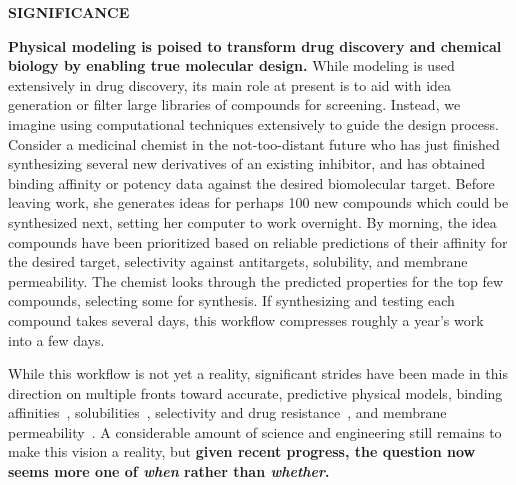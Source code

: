 \documentclass[11pt]{article}
\begin{document}




{\large \bf SIGNIFICANCE}

\textbf{Physical modeling is poised to transform drug discovery and chemical biology by enabling true molecular design.}
While modeling is used extensively in drug discovery, its main role at present is to aid with idea generation or filter large libraries of compounds for screening. 
Instead, we imagine using computational techniques extensively to guide the design process. 
Consider a medicinal chemist in the not-too-distant future who has just finished synthesizing several new derivatives of an existing inhibitor, and has obtained binding affinity or potency data against the desired biomolecular target. 
Before leaving work, she generates ideas for perhaps 100 new compounds which could be synthesized next, setting her computer to work overnight. 
By morning, the idea compounds have been prioritized based on reliable predictions of their affinity for the desired target, selectivity against antitargets, solubility, and membrane permeability.  
The chemist looks through the predicted properties for the top few compounds, selecting some for synthesis. 
If synthesizing and testing each compound takes several days, this workflow compresses roughly a year's work into a few days.

While this workflow is not yet a reality, significant strides have been made in this direction on multiple fronts toward accurate, predictive physical models, binding affinities~\cite{mobley_perspective_2012, christ_accuracy_2014, deng_distinguishing_2015, sherborne_preprint_2016, schrodinger_accurate_2015, christ_binding_2016, cui_affinity_2016, verras_free_2016}, solubilities~\cite{Schnieders:2012:J.Chem.TheoryComput., park_absolute_2014, liu_using_2016}, selectivity and drug resistance~\cite{leonis_contribution_2013}, and membrane permeability~\cite{lee_permeability_2016, comer_permeability_2014}. 
A considerable amount of science and engineering still remains to make this vision a reality, but \textbf{given recent progress, the question now seems more one of \emph{when} rather than \emph{whether}.} 
\end{document}
